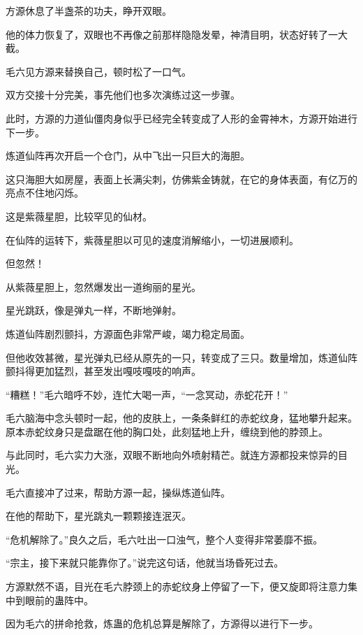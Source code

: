 
\begin{this_body}



方源休息了半盏茶的功夫，睁开双眼。

他的体力恢复了，双眼也不再像之前那样隐隐发晕，神清目明，状态好转了一大截。

毛六见方源来替换自己，顿时松了一口气。

双方交接十分完美，事先他们也多次演练过这一步骤。

此时，方源的力道仙僵肉身似乎已经完全转变成了人形的金霄神木，方源开始进行下一步。

炼道仙阵再次开启一个仓门，从中飞出一只巨大的海胆。

这只海胆大如房屋，表面上长满尖刺，仿佛紫金铸就，在它的身体表面，有亿万的亮点不住地闪烁。

这是紫薇星胆，比较罕见的仙材。

在仙阵的运转下，紫薇星胆以可见的速度消解缩小，一切进展顺利。

但忽然！

从紫薇星胆上，忽然爆发出一道绚丽的星光。

星光跳跃，像是弹丸一样，不断地弹射。

炼道仙阵剧烈颤抖，方源面色非常严峻，竭力稳定局面。

但他收效甚微，星光弹丸已经从原先的一只，转变成了三只。数量增加，炼道仙阵颤抖得更加猛烈，甚至发出嘎吱嘎吱的响声。

“糟糕！”毛六暗呼不妙，连忙大喝一声，“一念冥动，赤蛇花开！”

毛六脑海中念头顿时一起，他的皮肤上，一条条鲜红的赤蛇纹身，猛地攀升起来。原本赤蛇纹身只是盘踞在他的胸口处，此刻猛地上升，缠绕到他的脖颈上。

与此同时，毛六实力大涨，双眼不断地向外喷射精芒。就连方源都投来惊异的目光。

毛六直接冲了过来，帮助方源一起，操纵炼道仙阵。

在他的帮助下，星光跳丸一颗颗接连泯灭。

“危机解除了。”良久之后，毛六吐出一口浊气，整个人变得非常萎靡不振。

“宗主，接下来就只能靠你了。”说完这句话，他就当场昏死过去。

方源默然不语，目光在毛六脖颈上的赤蛇纹身上停留了一下，便又旋即将注意力集中到眼前的蛊阵中。

因为毛六的拼命抢救，炼蛊的危机总算是解除了，方源得以进行下一步。


\end{this_body}
